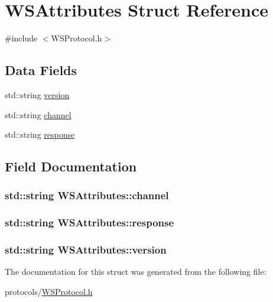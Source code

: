 \hypertarget{structWSAttributes}{\section{\-W\-S\-Attributes \-Struct \-Reference}
\label{structWSAttributes}
}


{\ttfamily \#include $<$\-W\-S\-Protocol.\-h$>$}

\subsection*{\-Data \-Fields}
\begin{DoxyCompactItemize}
\item 
std\-::string \hyperlink{structWSAttributes_acb11e5a740a94e0c7bb366e841682ac7}{version}
\item 
std\-::string \hyperlink{structWSAttributes_afde25f839a2b253bffb958848ae3ec9f}{channel}
\item 
std\-::string \hyperlink{structWSAttributes_a824eb4a348b7ed94e03fbf6e12ec277e}{response}
\end{DoxyCompactItemize}


\subsection{\-Field \-Documentation}
\hypertarget{structWSAttributes_afde25f839a2b253bffb958848ae3ec9f}{
\subsubsection[{channel}]{\setlength{\rightskip}{0pt plus 5cm}std\-::string {\bf \-W\-S\-Attributes\-::channel}}}\label{structWSAttributes_afde25f839a2b253bffb958848ae3ec9f}
\hypertarget{structWSAttributes_a824eb4a348b7ed94e03fbf6e12ec277e}{
\subsubsection[{response}]{\setlength{\rightskip}{0pt plus 5cm}std\-::string {\bf \-W\-S\-Attributes\-::response}}}\label{structWSAttributes_a824eb4a348b7ed94e03fbf6e12ec277e}
\hypertarget{structWSAttributes_acb11e5a740a94e0c7bb366e841682ac7}{
\subsubsection[{version}]{\setlength{\rightskip}{0pt plus 5cm}std\-::string {\bf \-W\-S\-Attributes\-::version}}}\label{structWSAttributes_acb11e5a740a94e0c7bb366e841682ac7}


\-The documentation for this struct was generated from the following file\-:\begin{DoxyCompactItemize}
\item 
protocols/\hyperlink{WSProtocol_8h}{\-W\-S\-Protocol.\-h}\end{DoxyCompactItemize}
